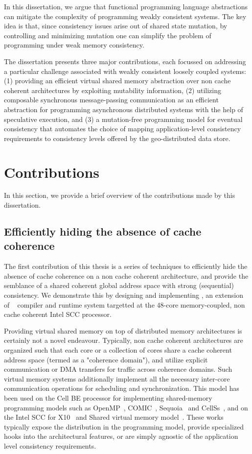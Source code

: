 In this dissertation, we argue that functional programming language
abstractions can mitigate the complexity of programming weakly consistent
systems. The key idea is that, since consistency issues arise out of shared
state mutation, by controlling and minimizing mutation one can simplify the
problem of programming under weak memory consistency.

The dissertation presents three major contributions, each focussed on
addressing a particular challenge associated with weakly consistent loosely
coupled systems: (1) providing an efficient virtual shared memory abstraction
over non cache coherent architectures by exploiting mutability information, (2)
utilizing composable synchronous message-passing communication as an efficient
abstraction for programming asynchronous distributed systems with the help of
speculative execution, and (3) a mutation-free programming model for eventual
consistency that automates the choice of mapping application-level consistency
requirements to consistency levels offered by the geo-distributed data store.

\section{Contributions}

In this section, we provide a brief overview of the contributions made by this
dissertation.

\subsection{Efficiently hiding the absence of cache coherence}

The first contribution of this thesis is a series of techniques to efficiently
hide the absence of cache coherence on a non cache coherent architecture, and
provide the semblance of a shared coherent global address space with strong
(sequential) consistency. We demonstrate this by designing and implementing
\MMSCC, an extension of \MM~\cite{JFP14} compiler and runtime system targetted
at the 48-core memory-coupled, non cache coherent Intel SCC processor.

Providing virtual shared memory on top of distributed memory architectures is
certainly not a novel endeavour. Typically, non cache coherent architectures
are organized such that each core or a collection of cores share a cache
coherent address space (termed as a "coherence domain"), and utilize explicit
communication or DMA transfers for traffic across coherence domains. Such
virtual memory systems additionally implement all the necessary inter-core
communication operations for scheduling and synchronization. This model has
been used on the Cell BE processor for implementing shared-memory programming
models such as OpenMP~\cite{OBrien2008}, COMIC~\cite{Lee2008},
Sequoia~\cite{Houston2008} and CellSs~\cite{Bellens2006}, and on the Intel SCC
for X10~\cite{Chapman2011} and Shared virtual memory model~\cite{Lankes2012}.
These works typically expose the distribution in the programming model, provide
specialized hooks into the architectural features, or are simply agnostic of
the application level consistency requirements.

